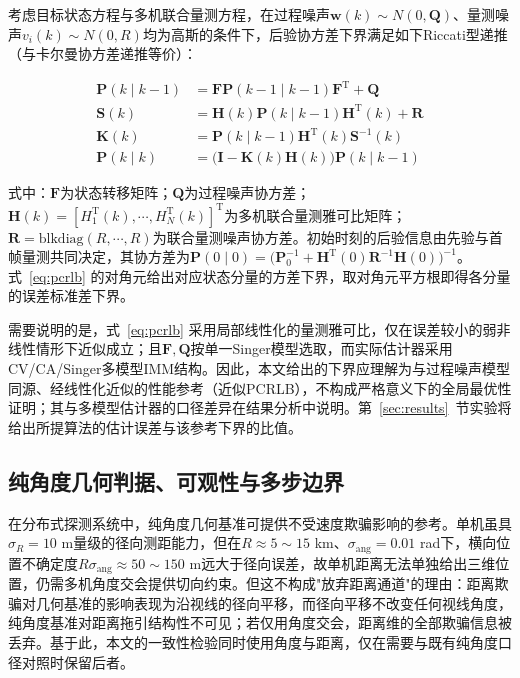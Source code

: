 \documentclass[UTF8,a4paper,zihao=-4]{ctexart}
\begin{document}
考虑目标状态方程与多机联合量测方程，在过程噪声\(\mathbf{w}(k)\sim N(0,\mathbf{Q})\)、量测噪声\(v_i(k)\sim N(0,R)\)均为高斯的条件下，后验协方差下界满足如下Riccati型递推（与卡尔曼协方差递推等价）：


\begin{equation}
\begin{aligned}
\mathbf{P}(k\mid k-1)&=\mathbf{F}\mathbf{P}(k-1\mid k-1)\mathbf{F}^{\mathrm T}+\mathbf{Q}\\
\mathbf{S}(k)&=\mathbf{H}(k)\mathbf{P}(k\mid k-1)\mathbf{H}^{\mathrm T}(k)+\mathbf{R}\\
\mathbf{K}(k)&=\mathbf{P}(k\mid k-1)\mathbf{H}^{\mathrm T}(k)\mathbf{S}^{-1}(k)\\
\mathbf{P}(k\mid k)&=\bigl(\mathbf{I}-\mathbf{K}(k)\mathbf{H}(k)\bigr)\mathbf{P}(k\mid k-1)
\end{aligned}
\label{eq:pcrlb}
\end{equation}


式中：\(\mathbf{F}\)为状态转移矩阵；\(\mathbf{Q}\)为过程噪声协方差；\(\mathbf{H}(k)=[H_1^{\mathrm T}(k),\cdots,H_N^{\mathrm T}(k)]^{\mathrm T}\)为多机联合量测雅可比矩阵；\(\mathbf{R}=\mathrm{blkdiag}(R,\cdots,R)\)为联合量测噪声协方差。初始时刻的后验信息由先验与首帧量测共同决定，其协方差为\(\mathbf{P}(0\mid 0)=\bigl(\mathbf{P}_0^{-1}+\mathbf{H}^{\mathrm T}(0)\mathbf{R}^{-1}\mathbf{H}(0)\bigr)^{-1}\)。式~\eqref{eq:pcrlb} 的对角元给出对应状态分量的方差下界，取对角元平方根即得各分量的误差标准差下界。

需要说明的是，式~\eqref{eq:pcrlb} 采用局部线性化的量测雅可比，仅在误差较小的弱非线性情形下近似成立；且\(\mathbf{F},\mathbf{Q}\)按单一Singer模型选取，而实际估计器采用CV/CA/Singer多模型IMM结构。因此，本文给出的下界应理解为与过程噪声模型同源、经线性化近似的性能参考（近似PCRLB），不构成严格意义下的全局最优性证明；其与多模型估计器的口径差异在结果分析中说明。第~\ref{sec:results}~节实验将给出所提算法的估计误差与该参考下界的比值。



\subsection{纯角度几何判据、可观性与多步边界}\label{sup:geometry}
在分布式探测系统中，纯角度几何基准可提供不受速度欺骗影响的参考。单机虽具\(\sigma_R=10\) m量级的径向测距能力，但在\(R\approx5\sim15\) km、\(\sigma_{\mathrm{ang}}=0.01\) rad下，横向位置不确定度\(R\sigma_{\mathrm{ang}}\approx50\sim150\) m远大于径向误差，故单机距离无法单独给出三维位置，仍需多机角度交会提供切向约束。但这不构成"放弃距离通道"的理由：距离欺骗对几何基准的影响表现为沿视线的径向平移，而径向平移不改变任何视线角度，纯角度基准对距离拖引结构性不可见；若仅用角度交会，距离维的全部欺骗信息被丢弃。基于此，本文的一致性检验同时使用角度与距离，仅在需要与既有纯角度口径对照时保留后者。
\end{document}
